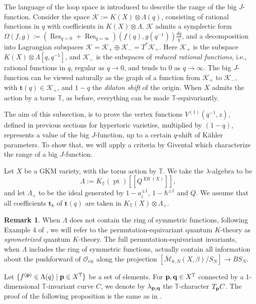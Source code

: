 \documentclass[10pt]{amsart}
\theoremstyle{definition}
\def\TT{\mathbb{T}}
\newcommand{\bt}{\mathbf{t}}
\newcommand{\cK}{\mathcal{K}}
\newcommand{\cM}{\mathcal{M}}
\newcommand{\cO}{\mathcal{O}}
\newcommand{\Eff}{\operatorname{Eff}}
\newcommand{\pt}{\operatorname{pt}}
\newcommand{\Res}{\operatorname{Res}}
\newcommand{\vir}{\mathrm{vir}}
\theoremstyle{definition}
\newtheorem{Remark}[Definition]{Remark}
\numberwithin{equation}{section}
\theoremstyle{Theorem}
\begin{document}
The language of the loop space is introduced to describe the range of the big $J$-function. Consider the space $\cK := K(X)\otimes \Lambda (q)$, consisting of rational functions in $q$ with coefficients in $K(X) \otimes \Lambda$. $\cK$ admits a symplectic form $\Omega (f, g) := \left( \Res_{q = 0} + \Res_{q = \infty} \right) (f (q), g (q^{-1}) ) \frac{dq}{q}$, and a decomposition into  Lagrangian subspaces $\cK = \cK_+ \oplus \cK_- = T^* \cK_+$. Here $\cK_+$ is the subspace $K(X)\otimes \Lambda [q, q^{-1}]$, and $\cK_-$ is the subspaces of \emph{reduced rational functions}, i.e., rational functions in $q$, regular as $q \to 0$, and tends to $0$ as $q\to \infty$. The big $J$-function can be viewed naturally as the graph of a function from $\cK_+$ to $\cK_-$, with $\bt(q) \in \cK_+$, and $1-q$ the \emph{dilaton shift} of the origin. When $X$ admits the action by a torus $\TT$, as before, everything can be made $\TT$-equivariantly.

The aim of this subsection, is to prove the vertex functions $V^{(1)} (q^{-1}, z)$, defined in previous sections for hypertoric varieties, multiplied by $(1-q)$, represents a value of the big $J$-function, up to a certain $q$-shift of K\"ahler parameters. To show that, we will apply a criteria by Givental which characterize the range of a big $J$-function.

Let $X$ be a GKM variety, with the torus action by $\TT$. We take the $\lambda$-algebra to be
$$
\Lambda := K_\TT (\pt) [[Q^{\Eff (X)}]],
$$
and let $\Lambda_+$ to be the ideal generated by $1 - a_i^{\pm 1}$, $1 - \hbar^{\pm 1}$ and $Q$. We assume that all coefficients $\bt_k$ of $\bt (q)$ are taken in $K_\TT (X) \otimes \Lambda_+$.

\begin{Remark}
When $\Lambda$ does not contain the ring of symmetric functions, following Example 4 of \cite{Giv1}, we will refer to the permutation-equivariant quantum $K$-theory as \emph{symmetrized} quantum $K$-theory. The full permutation-equivariant invariants, when $\Lambda$ includes the ring of symmetric functions, actually contain all information about the pushforward of $\cO_\vir$ along the projection $\left[ \overline{\cM}_{0,N}(X, \beta) / S_N \right] \to B S_N$.
\end{Remark}



Let $\{ f^{({\bf p})} \in  \Lambda (q) \mid {\bf p} \in X^\TT \}$ be a set of elements.
 For ${\bf p, q} \in X^\TT$ connected by a 1-dimensional $\TT$-invariant curve $C$, we denote by $\lambda_{\bf p,q}$ the $\TT$-character $T_{\bf p} C$. The proof of the following proposition is the same as in \cite{Giv2}.
\end{document}
